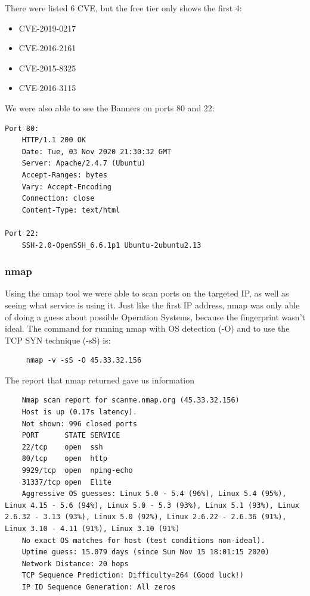  There were listed 6 CVE, but the free tier only shows the first 4:
 \begin{itemize}
    \item CVE-2019-0217
    \item CVE-2016-2161
    \item CVE-2015-8325
    \item CVE-2016-3115
 \end{itemize}
 
 We were also able to see the Banners on ports 80 and 22:
 
 \begin{lstlisting}
Port 80:
    HTTP/1.1 200 OK
    Date: Tue, 03 Nov 2020 21:30:32 GMT
    Server: Apache/2.4.7 (Ubuntu)
    Accept-Ranges: bytes
    Vary: Accept-Encoding
    Connection: close
    Content-Type: text/html

Port 22: 
    SSH-2.0-OpenSSH_6.6.1p1 Ubuntu-2ubuntu2.13
 \end{lstlisting}
 
\subsubsection{nmap}

Using the nmap tool we were able to scan ports on the targeted IP, as well as seeing what service is using it. Just like the first IP address, nmap was only able of doing a guess about possible Operation Systems, because the fingerprint wasn't ideal. The command for running nmap with OS detection (-O) and to use the TCP SYN technique (-sS) is:

\begin{lstlisting}
     nmap -v -sS -O 45.33.32.156
\end{lstlisting}

The report that nmap returned gave us information

\begin{lstlisting}
    Nmap scan report for scanme.nmap.org (45.33.32.156)
    Host is up (0.17s latency).
    Not shown: 996 closed ports
    PORT      STATE SERVICE
    22/tcp    open  ssh
    80/tcp    open  http
    9929/tcp  open  nping-echo
    31337/tcp open  Elite
    Aggressive OS guesses: Linux 5.0 - 5.4 (96%), Linux 5.4 (95%), Linux 4.15 - 5.6 (94%), Linux 5.0 - 5.3 (93%), Linux 5.1 (93%), Linux 2.6.32 - 3.13 (93%), Linux 5.0 (92%), Linux 2.6.22 - 2.6.36 (91%), Linux 3.10 - 4.11 (91%), Linux 3.10 (91%)
    No exact OS matches for host (test conditions non-ideal).
    Uptime guess: 15.079 days (since Sun Nov 15 18:01:15 2020)
    Network Distance: 20 hops
    TCP Sequence Prediction: Difficulty=264 (Good luck!)
    IP ID Sequence Generation: All zeros
\end{lstlisting}

